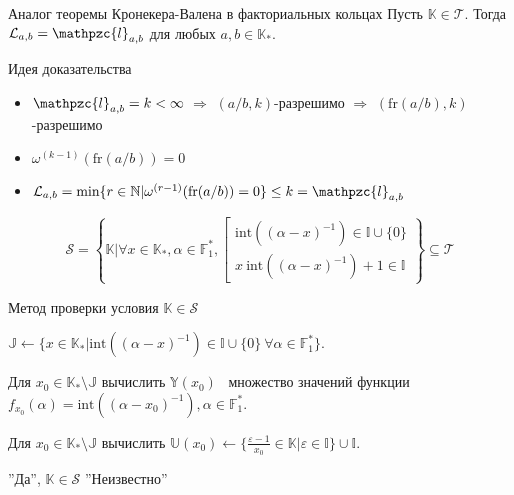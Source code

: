 \documentclass[8pt, xcolor=x11names]{beamer}
\begin{document}
\begin{frame}
    \begin{block}{Аналог теоремы Кронекера-Валена в факториальных кольцах}
        Пусть $\mathbb{K}\in\mathcal{T}$.
        Тогда $\mathcal{L}_{a,b}=\mathpzc{l}_{a,b}$ для любых $a,b\in\mathbb{K}_{*}$.
    \end{block}
    
    \begin{block}{Идея доказательства}
        \begin{itemize}
            \item $\mathpzc{l}_{a,b} = k < \infty$ $\Rightarrow$ $(a/b, k)$-разрешимо $\Rightarrow$ $(\textrm{fr}(a/b), k)$-разрешимо
            
            \item $\omega^{(k-1)}(\textrm{fr}(a/b)) = 0$
            
            \item $\mathcal{L}_{a,b}=\textrm{min}\{r\in\mathbb{N}|\omega^{(r-1)}(\textrm{fr}(a/b))=0\}\le k=\mathpzc{l}_{a,b}$
        \end{itemize}
    \end{block}
\end{frame}

\begin{frame}
    \begin{block_notitle}{}
        $$
        \mathcal{S} = \left\{
            \mathbb{K} \Big| \forall x\in\mathbb{K}_*, \alpha\in\mathbb{F}_{1}^{*}, \left[
                \begin{array}{l}
                    \textrm{int}((\alpha-x)^{-1})\in\mathbb{I}\cup\{0\}\\
                    x \ \textrm{int}((\alpha-x)^{-1})+1\in\mathbb{I}
                \end{array}
            \right.
        \right\} \subseteq \mathcal{T}
        $$
    \end{block_notitle}

    \begin{block}{Метод проверки условия $\mathbb{K}\in\mathcal{S}$}
        \begin{algorithmic}[1]
            \State $\mathbb{J} \gets \{x\in\mathbb{K}_{*}|\textrm{int}((\alpha-x)^{-1})\in\mathbb{I}\cup\{0\} \ \forall\alpha\in\mathbb{F}_{1}^{*}\}$.
    
            \State Для $x_0\in\mathbb{K}_*\setminus\mathbb{J}$ вычислить $\mathbb{Y}(x_{0})$ \textendash\ множество значений функции $f_{x_{0}}(\alpha)=\textrm{int}((\alpha-x_{0})^{-1}), \alpha\in\mathbb{F}_{1}^{*}$.
    
            \State Для $x_0\in\mathbb{K}_*\setminus\mathbb{J}$ вычислить $\mathbb{U}(x_{0}) \gets \{\frac{\varepsilon-1}{x_{0}}\in\mathbb{K}|\varepsilon\in\mathbb{I}\}\cup\mathbb{I}$.
    
                \State\Return ''Да'', $\mathbb{K}\in\mathcal{S}$
            \Else
                \State\Return ''Неизвестно''
            \EndIf
        \end{algorithmic}
    \end{block}
\end{frame}
\end{document}
